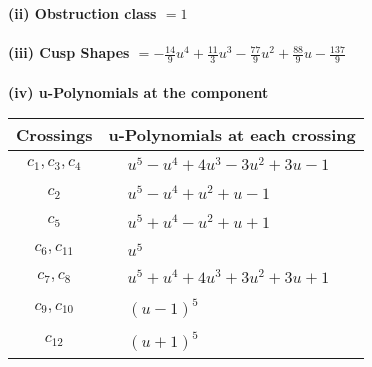 \documentclass[1p]{elsarticle_modified}
\theoremstyle{definition}
\begin{document}
\flushleft \textbf{(ii) Obstruction class $= 1$}\\~\\
\flushleft \textbf{(iii) Cusp Shapes $= -\frac{14}{9} u^4+\frac{11}{3} u^3-\frac{77}{9} u^2+\frac{88}{9} u-\frac{137}{9}$}\\~\\
\newpage\renewcommand{\arraystretch}{1}
\flushleft \textbf{(iv) u-Polynomials at the component}\newline \\
\begin{tabular}{m{50pt}|m{274pt}}
Crossings & \hspace{64pt}u-Polynomials at each crossing \\
\hline $$\begin{aligned}c_{1},c_{3},c_{4}\end{aligned}$$&$\begin{aligned}
&u^5- u^4+4 u^3-3 u^2+3 u-1
\end{aligned}$\\
\hline $$\begin{aligned}c_{2}\end{aligned}$$&$\begin{aligned}
&u^5- u^4+u^2+u-1
\end{aligned}$\\
\hline $$\begin{aligned}c_{5}\end{aligned}$$&$\begin{aligned}
&u^5+u^4- u^2+u+1
\end{aligned}$\\
\hline $$\begin{aligned}c_{6},c_{11}\end{aligned}$$&$\begin{aligned}
&u^5
\end{aligned}$\\
\hline $$\begin{aligned}c_{7},c_{8}\end{aligned}$$&$\begin{aligned}
&u^5+u^4+4 u^3+3 u^2+3 u+1
\end{aligned}$\\
\hline $$\begin{aligned}c_{9},c_{10}\end{aligned}$$&$\begin{aligned}
&(u-1)^5
\end{aligned}$\\
\hline $$\begin{aligned}c_{12}\end{aligned}$$&$\begin{aligned}
&(u+1)^5
\end{aligned}$\\
\hline
\end{tabular}\\~\\
\end{document}
